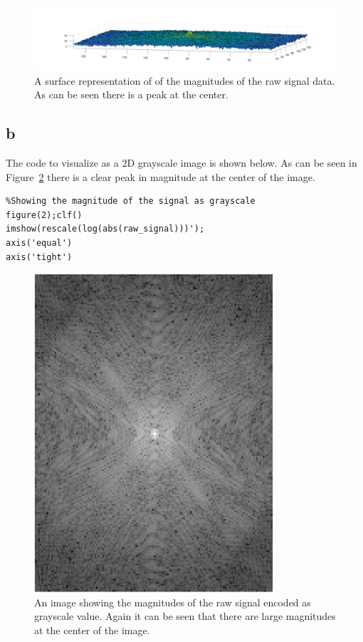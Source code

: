 \documentclass[12pt]{article}
\begin{document}
\begin{figure}[h]
	\centering
	\includegraphics[width=\textwidth]{Figures/freqSurf.png}
	\caption{A surface representation of of the magnitudes of the raw signal data. As can be seen there is a peak at the center.}
	\label{Fig:freq_surf}
\end{figure}

\subsection{b}
The code to visualize as a 2D grayscale image is shown below. As can be seen in Figure~\ref{Fig:freq_img} there is a clear peak in magnitude at the center of the image. 
\begin{lstlisting}[style=Matlab-editor]
%%
%Showing the magnitude of the signal as grayscale
figure(2);clf()
imshow(rescale(log(abs(raw_signal)))');
axis('equal')
axis('tight')
\end{lstlisting}
\begin{figure}[h]
	\centering
	\includegraphics[width=.7\textwidth]{Figures/freqImg.png}
	\caption{An image showing the magnitudes of the raw signal encoded as grayscale value. Again it can be seen that there are large magnitudes at the center of the image.}
	\label{Fig:freq_img}
\end{figure}
\end{document}
